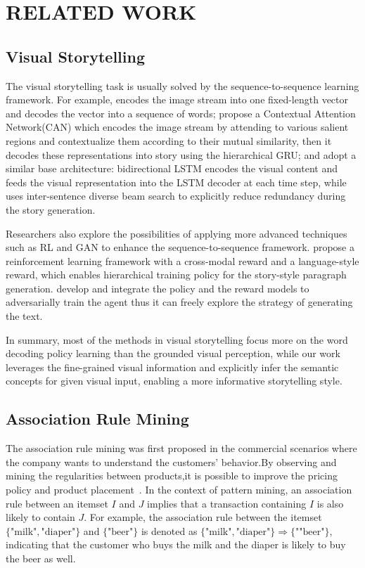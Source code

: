 \documentclass[sigconf]{acmart}
\begin{document}
\section{RELATED WORK}
\subsection{Visual Storytelling}
The visual storytelling task is usually solved by the sequence-to-sequence learning framework. For example, \cite{huang2016visual} encodes the image stream into one fixed-length vector and decodes the vector into a sequence of words; \cite{WangHanQi17} propose a Contextual Attention Network(CAN) which encodes the image stream by attending to various salient regions and contextualize them according to their mutual similarity, then it decodes these representations into story using the hierarchical GRU; \cite{Hsu18} and \cite{Kim18} adopt a similar base architecture: bidirectional LSTM encodes the visual content and feeds the visual representation into the LSTM decoder at each time step, while~\cite{Hsu18} uses inter-sentence diverse beam search to explicitly reduce redundancy during the story generation. 

Researchers also explore the possibilities of applying more advanced techniques such as RL and GAN to enhance the sequence-to-sequence framework. \cite{WangFu18} propose a reinforcement learning framework with a cross-modal reward and a language-style reward, which enables hierarchical training policy for the story-style paragraph generation. \cite{wang2018no} develop and integrate the policy and the reward models to adversarially train the agent thus it can freely explore the strategy of generating the text. 

In summary, most of the methods in visual storytelling focus more on the word decoding policy learning than the grounded visual perception, while our work leverages the fine-grained visual information and explicitly infer the semantic concepts for given visual input, enabling a more informative storytelling style. 

\subsection{Association Rule Mining}
The association rule mining was first proposed in the commercial scenarios where the company wants to understand the customers' behavior.By observing and mining the regularities between products,it is possible to improve the pricing policy and product placement~\cite{agrawal1993mining}. In the context of pattern mining, an association rule between an itemset $I$ and $J$ implies that a transaction containing $I$ is also likely to contain $J$. For example, the association rule between the itemset $\{\text{"milk"}, \text{"diaper"}\}$ and $\{\text{"beer"}\}$ is denoted as $\{\text{"milk"}, \text{"diaper"}\} \Rightarrow \{\text{""beer"}\}$, indicating that the customer who buys the milk and the diaper is likely to buy the beer as well.
\end{document}
